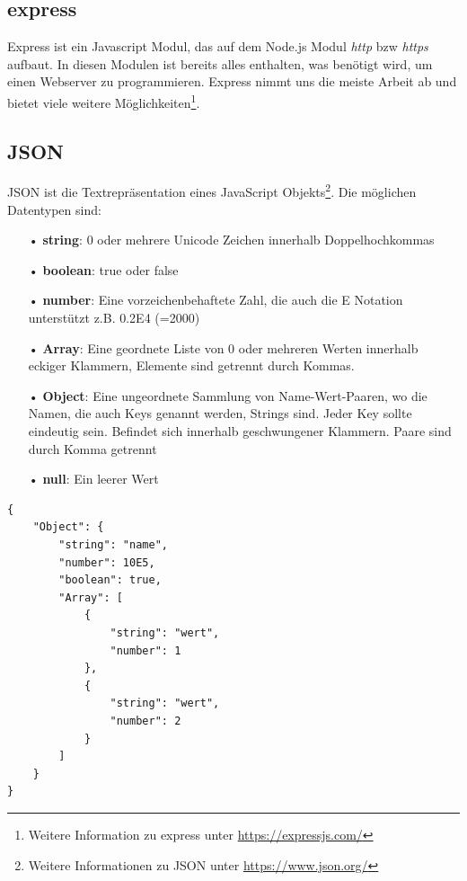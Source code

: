 \subsection{express}
\label{sec:vor-express}
Express ist ein Javascript Modul, das auf dem Node.js Modul \textit{http} bzw \textit{https} aufbaut. In diesen Modulen ist bereits alles enthalten, was benötigt wird, um einen Webserver zu programmieren. Express nimmt uns die meiste Arbeit ab und bietet viele weitere Möglichkeiten\footnote{Weitere Information zu express unter \url{https://expressjs.com/}}.

\subsection{JSON}
\label{sec:vor-json}
\ac{JSON} ist die Textrepräsentation eines JavaScript Objekts\footnote{Weitere Informationen zu \ac{JSON} unter \url{https://www.json.org/}}. Die möglichen Datentypen sind:

\begin{itemize}
\item[•] \textbf{string}: 0 oder mehrere Unicode Zeichen innerhalb Doppelhochkommas
\item[•] \textbf{boolean}: true oder false
\item[•] \textbf{number}: Eine vorzeichenbehaftete Zahl, die auch die E Notation unterstützt z.B. 0.2E4 (=2000)
\item[•] \textbf{Array}: Eine geordnete Liste von 0 oder mehreren Werten innerhalb eckiger Klammern, Elemente sind getrennt durch Kommas.
\item[•] \textbf{Object}: Eine ungeordnete Sammlung von Name-Wert-Paaren, wo die Namen, die auch Keys genannt werden, Strings sind. Jeder Key sollte eindeutig sein. Befindet sich innerhalb geschwungener Klammern. Paare sind durch Komma getrennt
\item[•] \textbf{null}: Ein leerer Wert
\end{itemize}

\begin{lstlisting}[style=JSON,caption=\ac{JSON} Beispiel]
{
	"Object": {	
		"string": "name",
		"number": 10E5,
		"boolean": true,
		"Array": [
			{
				"string": "wert",
				"number": 1
			},
			{
				"string": "wert",
				"number": 2
			}
		]
	}
}
\end{lstlisting}

